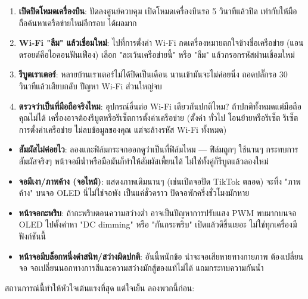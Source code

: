\begin{enumerate}
  \item \textbf{เปิดปิดโหมดเครื่องบิน}: ปัดลงศูนย์ควบคุม เปิดโหมดเครื่องบินรอ 5 วินาทีแล้วปิด เท่ากับให้มือถือค้นหาเครือข่ายใหม่อีกรอบ ได้ผลมาก
  \item \textbf{Wi-Fi "ลืม" แล้วเชื่อมใหม่}: ไปที่การตั้งค่า Wi-Fi กดเครื่องหมายตกใจข้างชื่อเครือข่าย (แอนดรอยด์คือไอคอนฟันเฟือง) เลือก "ละเว้นเครือข่ายนี้" หรือ "ลืม" แล้วกรอกรหัสผ่านเชื่อมใหม่
  \item \textbf{รีบูตเราเตอร์}: หลายบ้านเราเตอร์ไม่ได้ปิดเป็นเดือน นานเข้ามันจะไม่ค่อยนิ่ง ถอดปลั๊กรอ 30 วินาทีแล้วเสียบกลับ ปัญหา Wi-Fi ส่วนใหญ่จบ
  \item \textbf{ตรวจว่าเป็นที่มือถือจริงไหม}: อุปกรณ์อื่นต่อ Wi-Fi เดียวกันปกติไหม? ถ้าปกติทั้งหมดแต่มือถือคุณไม่ได้ เครื่องอาจต้องรีบูตหรือรีเซ็ตการตั้งค่าเครือข่าย (ตั้งค่า ทั่วไป โอนย้ายหรือรีเซ็ต รีเซ็ตการตั้งค่าเครือข่าย ไม่ลบข้อมูลของคุณ แต่จะล้างรหัส Wi-Fi ทั้งหมด)
\end{enumerate}


\begin{itemize}
  \item \textbf{สัมผัสไม่ค่อยไว}: ลองแกะฟิล์มกระจกออกดูว่าเป็นที่ฟิล์มไหม — ฟิล์มถูกๆ ใช้นานๆ กระทบการสัมผัสจริงๆ หน้าจอมีน้ำหรือมือมันก็ทำให้สัมผัสเพี้ยนได้ ไม่ใช่ทั้งคู่ก็รีบูตแล้วลองใหม่
  \item \textbf{จอมีเงา/ภาพค้าง (จอไหม้)}: แสดงภาพเดิมนานๆ (เช่นเปิดจอปัด TikTok ตลอด) จะทิ้ง "ภาพค้าง" บนจอ OLED นี่ไม่ใช่จอพัง เป็นแค่ชั่วคราว ปิดจอพักครึ่งชั่วโมงมักหาย
  \item \textbf{หน้าจอกะพริบ}: ถ้ากะพริบตอนความสว่างต่ำ อาจเป็นปัญหาการปรับแสง PWM พบมากบนจอ OLED ไปตั้งค่าหา "DC dimming" หรือ "กันกระพริบ" เปิดแล้วดีขึ้นเยอะ ไม่ใช่ทุกเครื่องมีฟังก์ชันนี้
  \item \textbf{หน้าจอมีบล็อกหนึ่งดำสนิท/สว่างผิดปกติ}: อันนี้หนักข้อ น่าจะจอเสียหายทางกายภาพ ต้องเปลี่ยนจอ จอเปลี่ยนนอกทางการสีและความสว่างมักสู้ของแท้ไม่ได้ แถมกระทบความกันน้ำ
\end{itemize}


สถานการณ์นี้ทำให้หัวใจเต้นแรงที่สุด แต่ใจเย็น ลองพวกนี้ก่อน:

